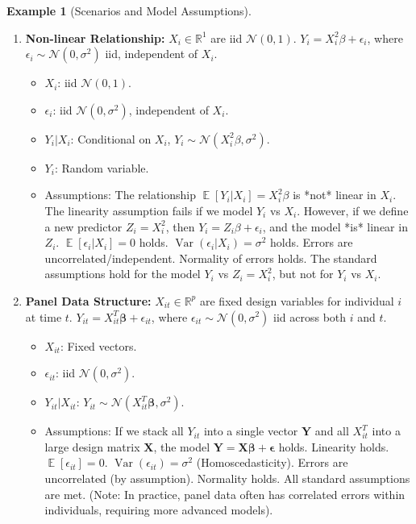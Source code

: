 \documentclass[11pt]{article}
\theoremstyle{definition}
\newtheorem{example}[theorem]{Example}
\theoremstyle{remark}
\DeclareMathOperator{\E}{\mathbb{E}}
\DeclareMathOperator{\Var}{\operatorname{Var}}
\begin{document}
\begin{example}[Scenarios and Model Assumptions]
\begin{enumerate}
        \item \textbf{Non-linear Relationship:} $X_i \in \mathbb{R}^1$ are iid $\mathcal{N}(0, 1)$. $Y_i = X_i^2 \beta + \epsilon_i$, where $\epsilon_i \sim \mathcal{N}(0, \sigma^2)$ iid, independent of $X_i$.
            \begin{itemize}
                \item $X_i$: iid $\mathcal{N}(0, 1)$.
                \item $\epsilon_i$: iid $\mathcal{N}(0, \sigma^2)$, independent of $X_i$.
                \item $Y_i | X_i$: Conditional on $X_i$, $Y_i \sim \mathcal{N}(X_i^2 \beta, \sigma^2)$.
                \item $Y_i$: Random variable.
                \item Assumptions: The relationship $\E[Y_i|X_i] = X_i^2 \beta$ is *not* linear in $X_i$. The linearity assumption fails if we model $Y_i$ vs $X_i$. However, if we define a new predictor $Z_i = X_i^2$, then $Y_i = Z_i \beta + \epsilon_i$, and the model *is* linear in $Z_i$. $\E[\epsilon_i|X_i] = 0$ holds. $\Var(\epsilon_i|X_i) = \sigma^2$ holds. Errors are uncorrelated/independent. Normality of errors holds. The standard assumptions hold for the model $Y_i$ vs $Z_i=X_i^2$, but not for $Y_i$ vs $X_i$.
            \end{itemize}
            
        \item \textbf{Panel Data Structure:} $X_{it} \in \mathbb{R}^p$ are fixed design variables for individual $i$ at time $t$. $Y_{it} = X_{it}^T \bm{\beta} + \epsilon_{it}$, where $\epsilon_{it} \sim \mathcal{N}(0, \sigma^2)$ iid across both $i$ and $t$.
            \begin{itemize}
                \item $X_{it}$: Fixed vectors.
                \item $\epsilon_{it}$: iid $\mathcal{N}(0, \sigma^2)$.
                \item $Y_{it} | X_{it}$: $Y_{it} \sim \mathcal{N}(X_{it}^T \bm{\beta}, \sigma^2)$.
                \item Assumptions: If we stack all $Y_{it}$ into a single vector $\bm{Y}$ and all $X_{it}^T$ into a large design matrix $\bm{X}$, the model $\bm{Y} = \bm{X}\bm{\beta} + \bm{\epsilon}$ holds. Linearity holds. $\E[\epsilon_{it}]=0$. $\Var(\epsilon_{it})=\sigma^2$ (Homoscedasticity). Errors are uncorrelated (by assumption). Normality holds. All standard assumptions are met. (Note: In practice, panel data often has correlated errors within individuals, requiring more advanced models).
            \end{itemize}
    \end{enumerate}
\end{example}
\end{document}

